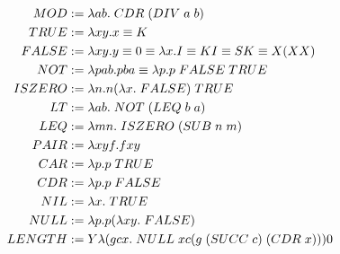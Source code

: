 \[\begin{aligned}
        MOD &:= \lambda ab. \hspace{0.1cm} CDR \hspace{0.1cm} (DIV \hspace{0.1cm} a \hspace{0.1cm} b)\\
        TRUE &:= \lambda xy. x \equiv K\\
        FALSE &:= \lambda xy. y \equiv 0 \equiv \lambda x. I \equiv K I \equiv S K \equiv X (X X)\\
        NOT &:= \lambda pab. p  b a \equiv \lambda p. p \hspace{0.1cm} FALSE \hspace{0.1cm} TRUE\\
        ISZERO &:= \lambda n. n (\lambda x. \hspace{0.1cm} FALSE) \hspace{0.1cm} TRUE\\
        LT &:= \lambda ab. \hspace{0.1cm} NOT \hspace{0.1cm} (LEQ \hspace{0.1cm} b \hspace{0.1cm} a)\\
        LEQ &:= \lambda mn. \hspace{0.1cm} ISZERO \hspace{0.1cm} (SUB \hspace{0.1cm} n \hspace{0.1cm} m)\\
        PAIR &:= \lambda xyf. f x y\\
        CAR &:= \lambda p. p \hspace{0.1cm} TRUE\\
        CDR &:= \lambda p. p \hspace{0.1cm} FALSE\\
        NIL &:= \lambda x. \hspace{0.1cm} TRUE\\
        NULL &:= \lambda p. p (\lambda xy. \hspace{0.1cm} FALSE)\\
        LENGTH &:= Y \lambda (gcx. \hspace{0.1cm} NULL \hspace{0.1cm} x c (g \hspace{0.1cm} (SUCC \hspace{0.1cm} c) \hspace{0.1cm} (CDR \hspace{0.1cm} x))) 0\\
    \end{aligned}
\]

